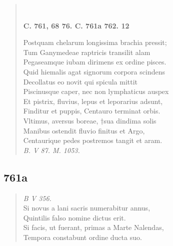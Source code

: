 \documentclass[11pt, a4paper]{report}
\begin{document}
\begin{verse}
        ﻿\pagebreak 
    \begin{center} \textbf{C. 761, 68 76. C. 761a 762. 12} \end{center} \marginpar{[246]} Postquam chelarum longissima brachia pressit; \\ Tum Ganymedeae raptricis transilit alam \\ Pegaseamque iubam dirimens ex ordine pisces. \\ Quid hiemalis agat signorum corpora scindens \\ Decollatus eo novit qui spicula mittit \\ Piscinusque caper, nec non lymphaticus auspex \\ Et pistrix, fluvius, lepus et leporarius adsunt, \\ Finditur et puppis, Centauro terminat orbis. \\ Vltimus, aversus boreae, †sua dindima solis \\ Manibus ostendit fluvio finitus et Argo, \\ Centaurique pedes postremos tangit et aram. \\ \textit{B. V 87. M. 1053.} \\ 
      \end{verse}
  
            \subsection*{761a}
      \begin{verse}
      \textit{B V 356.} \\ Si novus a lani sacris numerabitur annus, \\ Quintilis falso nomine dictus erit. \\ Si facis, ut fuerant, primas a Marte Nalendas, \\ Tempora constabunt ordine ducta suo. \\ 
      \end{verse}
  
\end{document}
